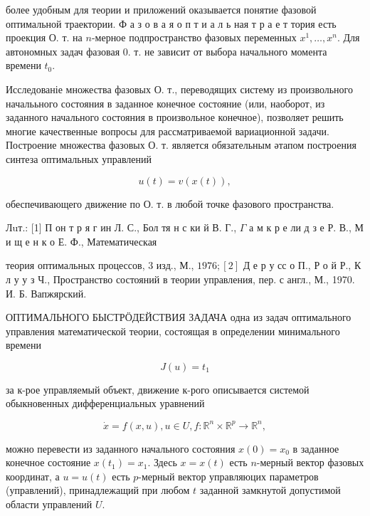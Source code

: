 \documentclass[10pt]{article}
\begin{document}
более удобным для теории и приложений оказывается понятие фазовой оптимальной траектории. Ф а з о в а я о п т и а л ь ная т р а е т тория есть проекция О. т. на $n$-мерное подпространство фазовых переменных $x^{1}, \ldots, x^{n}$. Для автономных задач фазовая 0. т. не зависит от выбора начального момента времени $t_{0}$.



Исследованіе множества фазовых О. т., переводящих систему из произвольного началььного состояния в заданное конечное состояние (или, наоборот, из заданного начального состояния в произвольное конечное), позволяет решить многие качественные вопросы для рассматриваемой вариационной задачи. Построение множества фазовых О. т. является обязательным әтапом построения синтеза оптимальных управлений



\[

u(t)=v(x(t)),

\]



обеспечивающего движение по О. т. в любой точке фазового пространства.



Лuт.: [1] П он т р я г ин Л. С., Бол тя н с ки й В. Г., $\Gamma$ а м к р е ли д з е Р. В., М и щ е н к о Е. Ф., Математическая

теория оптимальных процессов, 3 изд., М., $1976 ;[2]$ Д е р у сс о П., Р о й Р., К л у у з Ч., Пространство состояний в теории управления, пер. с англ., М., 1970. И. Б. Вапжярский.



ОПТИМАЛЬНОГО БЫСТРӦДЕЙСТВИЯ ЗАДАЧА одна из задач оптимального управления математической теории, состоящая в определении минимального времени



\[

J(u)=t_{1}

\]



за к-рое управляемый объект, движение к-рого описывается системой обыкновенных дифференциальных уравнений



\[

\dot{x}=f(x, u), u \in U, f: \mathbb{R}^{n} \times \mathbb{R}^{p} \longrightarrow \mathbb{R}^{n},

\]



можно перевести из заданного начального состояния $x(0)=x_{0}$ в заданное конечное состояние $x\left(t_{1}\right)=x_{1}$. Здесь $x=x(t)$ есть $n$-мерный вектор фазовых координат, а $u=u(t)$ есть $p$-мерный вектор управляюцих параметров (управлений), принадлежащий при любом $t$ заданной замкнутой допустимой области управлений $U$.
\end{document}
